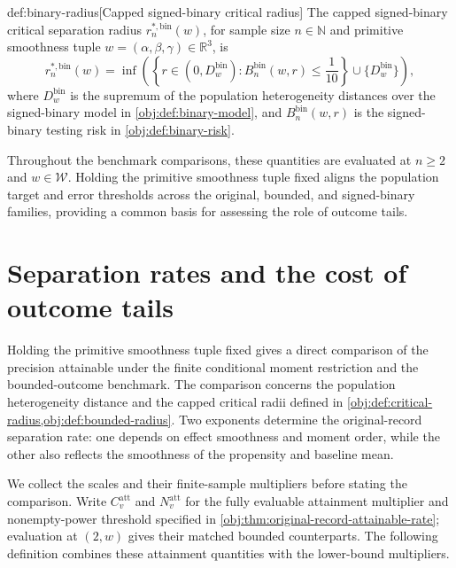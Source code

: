 \documentclass[11pt]{article}
\begin{document}
\begin{definitionv}{def:binary-radius}[Capped signed-binary critical radius]
The capped signed-binary critical separation radius \(r_n^{*,\mathrm{bin}}(w)\), for sample size \(n\in\mathbb N\) and primitive smoothness tuple \(w=(\alpha,\beta,\gamma)\in\mathbb R^3\), is
\[
r_n^{*,\mathrm{bin}}(w)
=
\inf\left(
\left\{r\in(0,D_w^{\mathrm{bin}}):
B_n^{\mathrm{bin}}(w,r)\le \frac{1}{10}\right\}
\cup\{D_w^{\mathrm{bin}}\}
\right),
\]
where \(D_w^{\mathrm{bin}}\) is the supremum of the population heterogeneity distances over the signed-binary model in \cref{obj:def:binary-model}, and \(B_n^{\mathrm{bin}}(w,r)\) is the signed-binary testing risk in \cref{obj:def:binary-risk}.
\end{definitionv}

Throughout the benchmark comparisons, these quantities are evaluated at \(n\ge2\) and \(w\in\mathcal W\). Holding the primitive smoothness tuple fixed aligns the population target and error thresholds across the original, bounded, and signed-binary families, providing a common basis for assessing the role of outcome tails.


\section{Separation rates and the cost of outcome tails}

Holding the primitive smoothness tuple fixed gives a direct comparison of the precision attainable under the finite conditional moment restriction and the bounded-outcome benchmark. The comparison concerns the population heterogeneity distance and the capped critical radii defined in \cref{obj:def:critical-radius,obj:def:bounded-radius}. Two exponents determine the original-record separation rate: one depends on effect smoothness and moment order, while the other also reflects the smoothness of the propensity and baseline mean.

We collect the scales and their finite-sample multipliers before stating the comparison. Write \(C^{\mathrm{att}}_v\) and \(N^{\mathrm{att}}_v\) for the fully evaluable attainment multiplier and nonempty-power threshold specified in \cref{obj:thm:original-record-attainable-rate}; evaluation at \((2,w)\) gives their matched bounded counterparts. The following definition combines these attainment quantities with the lower-bound multipliers.
\end{document}
